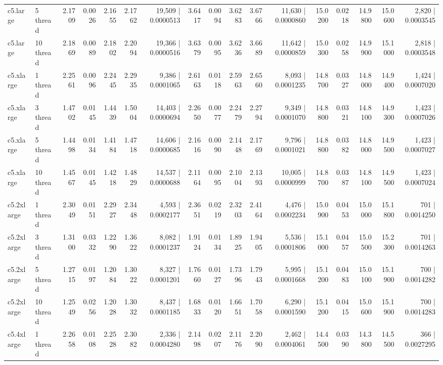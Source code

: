 \documentclass[conference]{IEEEtran}
\begin{document}
\begin{table}[h]
{\begin{tabular}{ll|rrrrr|rrrrr|rrrrr}
			c5.large & 5 thread & 2.1709 & 0.0026 & 2.1655 & 2.1762 & 19,509 | 0.0000513 & 3.6417 & 0.0094 & 3.6283 & 3.6766 & 11,630 | 0.0000860 & 15.0200 & 0.0218 & 14.9800 & 15.0600 & 2,820 | 0.0003545 \\
			c5.large & 10 thread & 2.1869 & 0.0089 & 2.1802 & 2.2094 & 19,366 | 0.0000516 & 3.6379 & 0.0095 & 3.6236 & 3.6689 & 11,642 | 0.0000859 & 15.0300 & 0.0258 & 14.9900 & 15.1000 & 2,818 | 0.0003548 \\
			\midrule
			c5.xlarge & 1 thread & 2.2561 & 0.0096 & 2.2445 & 2.2935 & 9,386 | 0.0001065 & 2.6163 & 0.0118 & 2.5963 & 2.6560 & 8,093 | 0.0001235 & 14.8700 & 0.0327 & 14.8000 & 14.9400 & 1,424 | 0.0007020 \\
			c5.xlarge & 3 thread & 1.4702 & 0.0145 & 1.4439 & 1.5004 & 14,403 | 0.0000694 & 2.2650 & 0.0077 & 2.2479 & 2.2794 & 9,349 | 0.0001070 & 14.8800 & 0.0321 & 14.8100 & 14.9300 & 1,423 | 0.0007026 \\
			c5.xlarge & 5 thread & 1.4498 & 0.0134 & 1.4184 & 1.4718 & 14,606 | 0.0000685 & 2.1616 & 0.0090 & 2.1448 & 2.1769 & 9,796 | 0.0001021 & 14.8800 & 0.0382 & 14.8000 & 14.9500 & 1,423 | 0.0007027 \\
			c5.xlarge & 10 thread & 1.4567 & 0.0145 & 1.4218 & 1.4829 & 14,537 | 0.0000688 & 2.1164 & 0.0095 & 2.1004 & 2.1393 & 10,005 | 0.0000999 & 14.8700 & 0.0387 & 14.8100 & 14.9500 & 1,423 | 0.0007024 \\
			\midrule
			c5.2xlarge & 1 thread & 2.3049 & 0.0151 & 2.2927 & 2.3448 & 4,593 | 0.0002177 & 2.3651 & 0.0219 & 2.3203 & 2.4164 & 4,476 | 0.0002234 & 15.0900 & 0.0453 & 15.0000 & 15.1800 & 701 | 0.0014250 \\
			c5.2xlarge & 3 thread & 1.3100 & 0.0332 & 1.2290 & 1.3622 & 8,082 | 0.0001237 & 1.9124 & 0.0134 & 1.8925 & 1.9405 & 5,536 | 0.0001806 & 15.1000 & 0.0457 & 15.0500 & 15.2300 & 701 | 0.0014263 \\
			c5.2xlarge & 5 thread & 1.2715 & 0.0197 & 1.2084 & 1.3022 & 8,327 | 0.0001201 & 1.7660 & 0.0127 & 1.7396 & 1.7943 & 5,995 | 0.0001668 & 15.1200 & 0.0483 & 15.0100 & 15.1900 & 700 | 0.0014282 \\
			c5.2xlarge & 10 thread & 1.2549 & 0.0256 & 1.2028 & 1.3032 & 8,437 | 0.0001185 & 1.6833 & 0.0120 & 1.6651 & 1.7058 & 6,290 | 0.0001590 & 15.1200 & 0.0415 & 15.0600 & 15.1900 & 700 | 0.0014283 \\
			\midrule
			c5.4xlarge & 1 thread & 2.2658 & 0.0108 & 2.2528 & 2.3082 & 2,336 | 0.0004280 & 2.1498 & 0.0207 & 2.1176 & 2.2090 & 2,462 | 0.0004061 & 14.4500 & 0.0390 & 14.3800 & 14.5500 & 366 | 0.0027295 \\

\end{tabular}}
\end{table}
\end{document}
